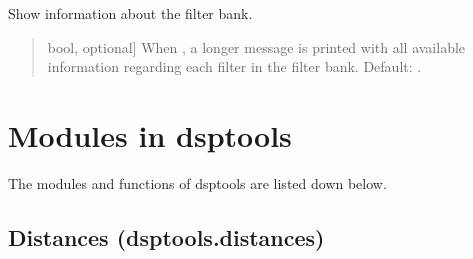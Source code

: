 \documentclass[letterpaper,10pt,english]{sphinxmanual}
\begin{document}
\begin{fulllineitems}
\begin{fulllineitems}
\label{\detokenize{classes:dsptools.classes.filterbank.FilterBank.show_info}}
\pysigstartsignatures
{}
\pysigstopsignatures
\sphinxAtStartPar
Show information about the filter bank.
\begin{quote}\begin{description}
\begin{description}
\sphinxlineitem{\sphinxstylestrong{show\_filters\_info}}{[}bool, optional{]}
\sphinxAtStartPar
When , a longer message is printed with all available
information regarding each filter in the filter bank.
Default: .

\end{description}

\end{description}\end{quote}

\end{fulllineitems}


\end{fulllineitems}


\sphinxstepscope


\chapter{Modules in dsptools}
\label{\detokenize{modules:modules-in-dsptools}}\label{\detokenize{modules::doc}}
\sphinxAtStartPar
The modules and functions of dsptools are listed down below.

\sphinxstepscope


\section{Distances (dsptools.distances)}
\label{\detokenize{modules/dsptools.distances:module-dsptools.distances}}\label{\detokenize{modules/dsptools.distances:distances-dsptools-distances}}\label{\detokenize{modules/dsptools.distances::doc}}
\end{document}
